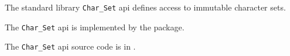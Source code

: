 
The standard library {\tt Char\_Set} api defines access to immutable character sets.

The {\tt Char\_Set} api is implemented by the  package.

The {\tt Char\_Set} api source code is in .

